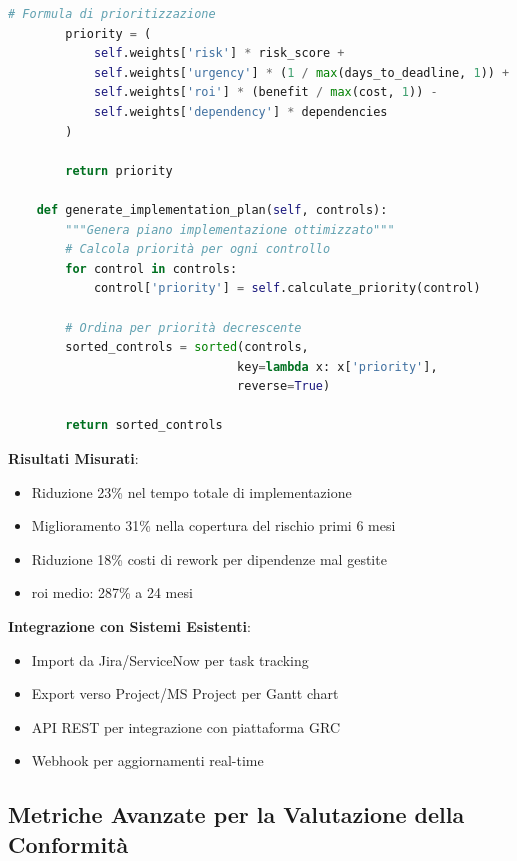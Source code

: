 \begin{tcolorbox}
\begin{lstlisting}[language=Python]
        # Formula di prioritizzazione
        priority = (
            self.weights['risk'] * risk_score +
            self.weights['urgency'] * (1 / max(days_to_deadline, 1)) +
            self.weights['roi'] * (benefit / max(cost, 1)) -
            self.weights['dependency'] * dependencies
        )
        
        return priority
    
    def generate_implementation_plan(self, controls):
        """Genera piano implementazione ottimizzato"""
        # Calcola priorità per ogni controllo
        for control in controls:
            control['priority'] = self.calculate_priority(control)
        
        # Ordina per priorità decrescente
        sorted_controls = sorted(controls, 
                                key=lambda x: x['priority'], 
                                reverse=True)
        
        return sorted_controls
\end{lstlisting}

\vspace{0.3cm}
\textbf{Risultati Misurati}:
\begin{itemize}
\item Riduzione 23\% nel tempo totale di implementazione
\item Miglioramento 31\% nella copertura del rischio primi 6 mesi
\item Riduzione 18\% costi di rework per dipendenze mal gestite
\item \gls{roi} medio: 287\% a 24 mesi
\end{itemize}

\vspace{0.3cm}
\textbf{Integrazione con Sistemi Esistenti}:
\begin{itemize}
\item Import da Jira/ServiceNow per task tracking
\item Export verso Project/MS Project per Gantt chart
\item API REST per integrazione con piattaforma GRC
\item Webhook per aggiornamenti real-time
\end{itemize}
\end{tcolorbox}

\subsection{Metriche Avanzate per la Valutazione della Conformità}


